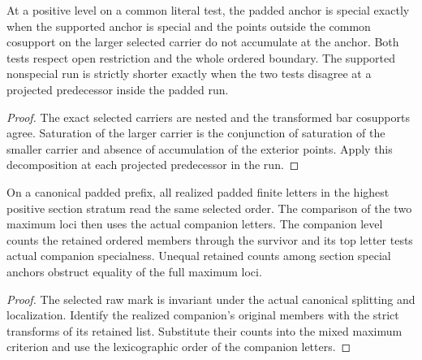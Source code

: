 \begin{theorem}
\label{hir:g1-born-special-carrier-cutoff}
\leanok
At a positive level on a common literal test, the padded
anchor is special exactly when the supported anchor is
special and the points outside the common cosupport on the
larger selected carrier do not accumulate at the anchor.
Both tests respect open restriction and the whole ordered
boundary. The supported nonspecial run is strictly shorter
exactly when the two tests disagree at a projected predecessor
inside the padded run.
\end{theorem}
\begin{proof}
The exact selected carriers are nested and the transformed bar
cosupports agree. Saturation of the larger carrier is the
conjunction of saturation of the smaller carrier and absence
of accumulation of the exterior points. Apply this
decomposition at each projected predecessor in the run.
\end{proof}

\begin{theorem}
\label{hir:g1-later-mixed-centre-boundary-trace}
\leanok
On a canonical padded prefix, all realized padded finite
letters in the highest positive section stratum read the
same selected order. The comparison of the two maximum
loci then uses the actual companion letters. The companion
level counts the retained ordered members through the
survivor and its top letter tests actual companion
specialness. Unequal retained counts among section special
anchors obstruct equality of the full maximum loci.
\end{theorem}
\begin{proof}
The selected raw mark is invariant under the actual
canonical splitting and localization. Identify the
realized companion's original members with the strict
transforms of its retained list. Substitute their counts
into the mixed maximum criterion and use the lexicographic
order of the companion letters.
\end{proof}

